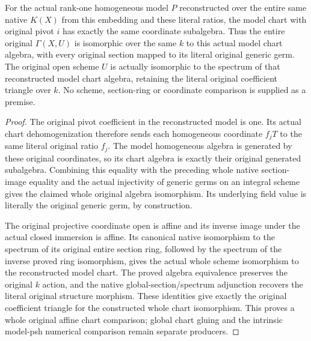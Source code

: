 \begin{theorem}
\label{thm:projective-native-model-chart-algebra}
\leanok
{}
For the actual rank-one homogeneous model $P$ reconstructed over the
entire same native $K(X)$ from this embedding and these literal ratios,
the model chart with original pivot $i$ has exactly the same coordinate
subalgebra. Thus the entire original $\Gamma(X,U)$ is isomorphic over
the same $k$ to this actual model chart algebra, with every original
section mapped to its literal original generic germ. The original open
scheme $U$ is actually isomorphic to the spectrum of that reconstructed
model chart algebra, retaining the literal original coefficient
triangle over $k$. No scheme, section-ring or coordinate comparison
is supplied as a premise.
\end{theorem}
\begin{proof}
The original pivot coefficient in the reconstructed model is one. Its
actual chart dehomogenization therefore sends each homogeneous coordinate
$f_jT$ to the same literal original ratio $f_j$. The model homogeneous
algebra is generated by these original coordinates, so its chart algebra
is exactly their original generated subalgebra. Combining this equality
with the preceding whole native section-image equality and the actual
injectivity of generic germs on an integral scheme gives the claimed
whole original algebra isomorphism. Its underlying field value is
literally the original generic germ, by construction.

The original projective coordinate open is affine and its inverse image
under the actual closed immersion is affine. Its canonical native
isomorphism to the spectrum of its original entire section ring,
followed by the spectrum of the inverse proved ring isomorphism, gives
the actual whole scheme isomorphism to the reconstructed model chart.
The proved algebra equivalence preserves the original $k$ action, and
the native global-section/spectrum adjunction recovers the literal
original structure morphism. These identities give exactly the original
coefficient triangle for the constructed whole chart isomorphism.
This proves a whole original affine chart comparison; global chart
gluing and the intrinsic model-psh numerical comparison remain separate
producers.
\end{proof}
